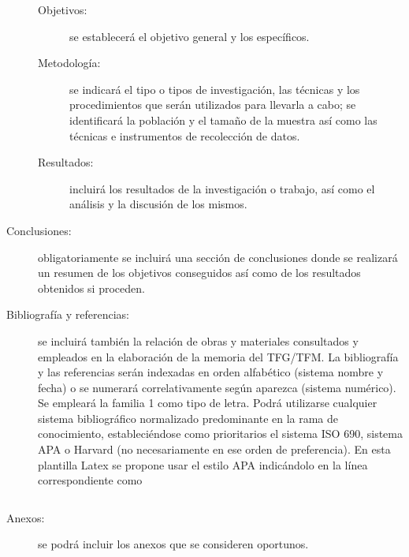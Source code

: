 \begin{description}
\begin{description}
\item[Objetivos:] se establecerá el objetivo general y los específicos.
\item[Metodología:] se indicará el tipo o tipos de investigación, las técnicas y los procedimientos que serán utilizados para llevarla a cabo; se identificará la población y el tamaño de la muestra así como las técnicas e instrumentos de recolección de datos.
\item[Resultados:] incluirá los resultados de la investigación o trabajo, así como el análisis y la discusión de los mismos.
\end{description}
\item[Conclusiones:] obligatoriamente se incluirá una sección de conclusiones donde se realizará un resumen de los objetivos conseguidos así como de los resultados obtenidos si proceden.
\item[Bibliografía y referencias:] se incluirá también la relación de obras y materiales consultados y empleados en la elaboración de la memoria del \ac{TFG}/\ac{TFM}. La bibliografía y las referencias serán indexadas en orden alfabético (sistema nombre y fecha) o se numerará correlativamente según aparezca (sistema numérico). Se empleará la familia 1 como tipo de letra. Podrá utilizarse cualquier sistema bibliográfico normalizado predominante en la rama de conocimiento, estableciéndose como prioritarios el sistema ISO 690, sistema \ac{APA}  o Harvard (no necesariamente en ese orden de preferencia). En esta plantilla Latex se propone usar el estilo \ac{APA} indicándolo en la línea correspondiente como 
\begin{verbatim}

\end{verbatim}


\item[Anexos:] se podrá incluir los anexos que se consideren oportunos.

\end{description}



